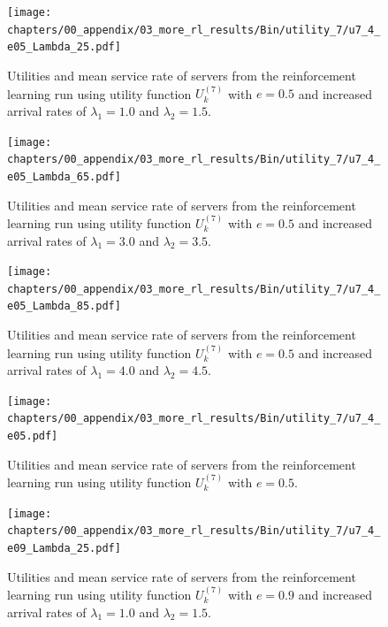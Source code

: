\begin{figure}[H]
    \texttt{[image: chapters/00\_appendix/03\_more\_rl\_results/Bin/utility\_7/u7\_4\_e05\_Lambda\_25.pdf]}
    \caption{Utilities and mean service rate of servers from the reinforcement
    learning run using utility function \(U_k^{(7)}\) with \(e = 0.5\) and
    increased arrival rates of \(\lambda_1 = 1.0\) and \(\lambda_2 = 1.5\).}
    \label{fig:RL_utility7_4_e05_Lambda_25}
\end{figure}

\begin{figure}[H]
    \texttt{[image: chapters/00\_appendix/03\_more\_rl\_results/Bin/utility\_7/u7\_4\_e05\_Lambda\_65.pdf]}
    \caption{Utilities and mean service rate of servers from the reinforcement
    learning run using utility function \(U_k^{(7)}\) with \(e = 0.5\) and
    increased arrival rates of \(\lambda_1 = 3.0\) and \(\lambda_2 = 3.5\).}
    \label{fig:RL_utility7_4_e05_Lambda_65}
\end{figure}

\begin{figure}[H]
    \texttt{[image: chapters/00\_appendix/03\_more\_rl\_results/Bin/utility\_7/u7\_4\_e05\_Lambda\_85.pdf]}
    \caption{Utilities and mean service rate of servers from the reinforcement
    learning run using utility function \(U_k^{(7)}\) with \(e = 0.5\) and
    increased arrival rates of \(\lambda_1 = 4.0\) and \(\lambda_2 = 4.5\).}
    \label{fig:RL_utility7_4_e05_Lambda_85}
\end{figure}

\begin{figure}[H]
    \texttt{[image: chapters/00\_appendix/03\_more\_rl\_results/Bin/utility\_7/u7\_4\_e05.pdf]}
    \caption{Utilities and mean service rate of servers from the reinforcement
    learning run using utility function \(U_k^{(7)}\) with \(e = 0.5\).}
    \label{fig:RL_utility7_4_e05}
\end{figure}

\begin{figure}[H]
    \texttt{[image: chapters/00\_appendix/03\_more\_rl\_results/Bin/utility\_7/u7\_4\_e09\_Lambda\_25.pdf]}
    \caption{Utilities and mean service rate of servers from the reinforcement
    learning run using utility function \(U_k^{(7)}\) with \(e = 0.9\) and
    increased arrival rates of \(\lambda_1 = 1.0\) and \(\lambda_2 = 1.5\).}
    \label{fig:RL_utility7_4_e09_Lambda_25}
\end{figure}

